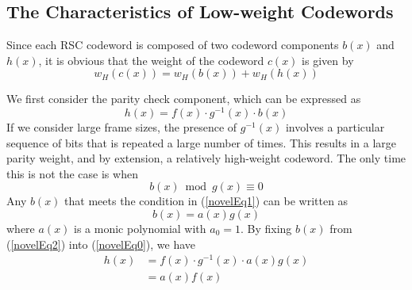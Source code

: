 \subsection{The Characteristics of Low-weight Codewords}
\label{subsec:low-weight}
Since each RSC codeword is composed of two codeword components $b(x)$ and $h(x)$, it is obvious that the weight of the codeword $c(x)$ is given by 
\begin{equation}
w_H(c(x))=w_H(b(x)) + w_H(h(x))
\label{novelEq-1}
\end{equation} 

We first consider the parity check component, which can be expressed as 
\begin{equation}
h(x) =f(x)\cdot g^{-1}(x)\cdot b(x)
\label{novelEq0}
\end{equation}
If we consider large frame sizes, the presence of $g^{-1}(x)$ involves a particular sequence of bits that is repeated a large number of times. This results in a large parity weight, and by extension, a relatively high-weight codeword. The only time this is not the case is when
\begin{equation}
b(x) \bmod g(x) \equiv 0
\label{novelEq1}
\end{equation}
Any $b(x)$ that meets the condition in (\ref{novelEq1}) can be written as 
\begin{equation}
b(x) =a(x)g(x)
\label{novelEq2}
\end{equation}
where $a(x)$ is a monic polynomial with $a_0=1$.
By fixing $b(x)$ from (\ref{novelEq2}) into (\ref{novelEq0}), we have 
\begin{equation}
\begin{split}
h(x)&=f(x)\cdot g^{-1}(x)\cdot a(x)g(x)\\
&=a(x)f(x)
\end{split}
\label{novelEq3}
\end{equation}

